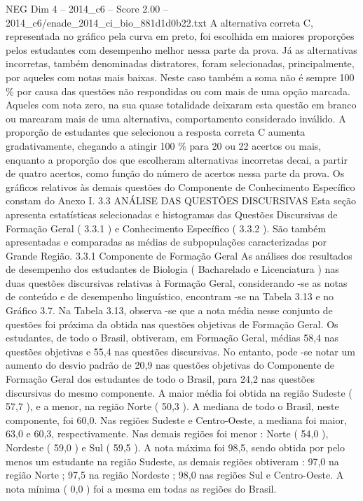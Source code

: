 \begin{textsample}{NEG Dim 4 – 2014\_c6 – Score 2.00 – 2014\_c6/enade\_2014\_ci\_bio\_881d1d0b22.txt}
A alternativa correta C, representada no gráfico pela curva em preto, foi escolhida em maiores proporções pelos estudantes com desempenho melhor nessa parte da prova.
Já as alternativas incorretas, também denominadas distratores, foram selecionadas, principalmente, por aqueles com notas mais baixas.
Neste caso também a soma não é sempre 100 \% por causa das questões não respondidas ou com mais de uma opção marcada.
Aqueles com nota zero, na sua quase totalidade deixaram esta questão em branco ou marcaram mais de uma alternativa, comportamento considerado inválido.
A proporção de estudantes que selecionou a resposta correta C aumenta gradativamente, chegando a atingir 100 \% para 20 ou 22 acertos ou mais, enquanto a proporção dos que escolheram alternativas incorretas decai, a partir de quatro acertos, como função do número de acertos nessa parte da prova.
Os gráficos relativos às demais questões do Componente de Conhecimento Específico constam do Anexo I. 3.3 ANÁLISE DAS QUESTÕES DISCURSIVAS Esta seção apresenta estatísticas selecionadas e histogramas das Questões Discursivas de Formação Geral ( 3.3.1 ) e Conhecimento Específico ( 3.3.2 ).
São também apresentadas e comparadas as médias de subpopulações caracterizadas por Grande Região. 3.3.1 Componente de Formação Geral As análises dos resultados de desempenho dos estudantes de Biologia ( Bacharelado e Licenciatura ) nas duas questões discursivas relativas à Formação Geral, considerando -se as notas de conteúdo e de desempenho linguístico, encontram -se na Tabela 3.13 e no Gráfico 3.7.
Na Tabela 3.13, observa -se que a nota média nesse conjunto de questões foi próxima da obtida nas questões objetivas de Formação Geral.
Os estudantes, de todo o Brasil, obtiveram, em Formação Geral, médias 58,4 nas questões objetivas e 55,4 nas questões discursivas.
No entanto, pode -se notar um aumento do desvio padrão de 20,9 nas questões objetivas do Componente de Formação Geral dos estudantes de todo o Brasil, para 24,2 nas questões discursivas do mesmo componente.
A maior média foi obtida na região Sudeste ( 57,7 ), e a menor, na região Norte ( 50,3 ).
A mediana de todo o Brasil, neste componente, foi 60,0.
Nas regiões Sudeste e Centro-Oeste, a mediana foi maior, 63,0 e 60,3, respectivamente.
Nas demais regiões foi menor : Norte ( 54,0 ), Nordeste ( 59,0 ) e Sul ( 59,5 ).
A nota máxima foi 98,5, sendo obtida por pelo menos um estudante na região Sudeste, as demais regiões obtiveram : 97,0 na região Norte ; 97,5 na região Nordeste ; 98,0 nas regiões Sul e Centro-Oeste.
A nota mínima ( 0,0 ) foi a mesma em todas as regiões do Brasil.

\end{textsample}
